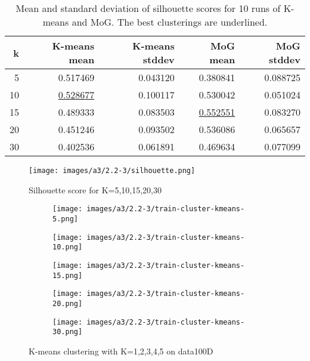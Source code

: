 \documentclass[12pt]{article}
\begin{document}
\begin{table}[!htb]
\centering
\begin{tabular}{r|r|r|r|r}
\hline
 k &  K-means mean & K-means stddev & MoG mean & MoG stddev \\
\hline
 5 &     0.517469 &    0.043120 &  0.380841 &  0.088725 \\
10 &     \underline{0.528677} &    0.100117 &  0.530042 &  0.051024 \\
15 &     0.489333 &    0.083503 &  \underline{0.552551} &  0.083270 \\
20 &     0.451246 &    0.093502 &  0.536086 &  0.065657 \\
30 &     0.402536 &    0.061891 &  0.469634 &  0.077099 \\
\hline
\end{tabular}
\caption{Mean and standard deviation of silhouette scores for 10 runs of K-means and MoG. The best clusterings are underlined.}
\label{table:a3-2.2.3-silhouette}
\end{table}


\begin{figure}[!htb]
\centering
\texttt{[image: images/a3/2.2-3/silhouette.png]}
\caption{Silhouette score for K=5,10,15,20,30}
\label{fig:a3-2.2-3-silhouette}
\end{figure}

\begin{figure}[!htb]
\centering
\begin{subfigure}{.33\linewidth}
  \centering
  \texttt{[image: images/a3/2.2-3/train-cluster-kmeans-5.png]}
\end{subfigure}%
\begin{subfigure}{.33\linewidth}
  \centering
  \texttt{[image: images/a3/2.2-3/train-cluster-kmeans-10.png]}
\end{subfigure}
\begin{subfigure}{.33\linewidth}
  \centering
  \texttt{[image: images/a3/2.2-3/train-cluster-kmeans-15.png]}
\end{subfigure}
\begin{subfigure}{.33\linewidth}
  \centering
  \texttt{[image: images/a3/2.2-3/train-cluster-kmeans-20.png]}
\end{subfigure}
\begin{subfigure}{.33\linewidth}
  \centering
  \texttt{[image: images/a3/2.2-3/train-cluster-kmeans-30.png]}
\end{subfigure}
\caption{K-means clustering with K=1,2,3,4,5 on data100D}
\label{fig:a3-2.2-3-kmeans}
\end{figure}
\end{document}
